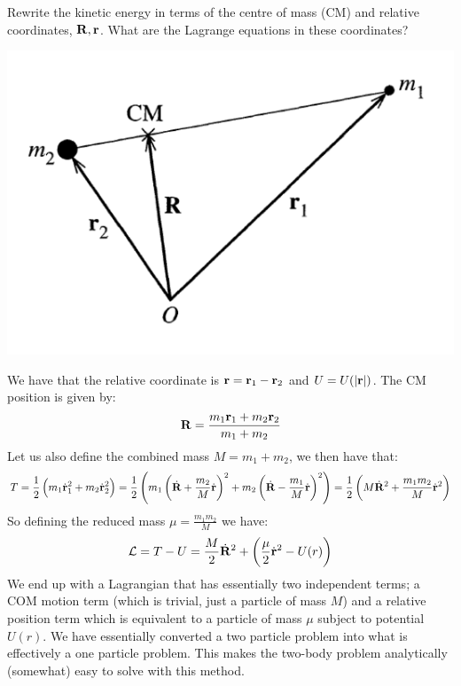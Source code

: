 \documentclass[../PHYS306Notes.tex]{subfiles}
\begin{document}
\begin{p}
Rewrite the kinetic energy in terms of the centre of mass (CM) and relative coordinates, $\mathbf{R}, \mathbf{r}$. What are the Lagrange equations in these coordinates?
\begin{center}
    \includegraphics[scale=0.6]{Lecture-3/W3-img1.png}
\end{center}
\end{p}
\begin{s}
We have that the relative coordinate is $\mathbf{r} = \mathbf{r}_1 - \mathbf{r}_2$ and $U = U(\abs{\mathbf{r}})$. The CM position is given by:
\[\mathbf{R} = \frac{m_1\mathbf{r}_1 + m_2\mathbf{r}_2}{m_1 + m_2}\]
Let us also define the combined mass $M = m_1 + m_2$, we then have that:
\[T = \frac{1}{2}\left(m_1\dot{\mathbf{r}}_1^2 + m_2\dot{\mathbf{r}}_2^2\right) = \frac{1}{2}\left(m_1\left(\dot{\mathbf{R}} + \frac{m_2}{M}\dot{\mathbf{r}}\right)^2 + m_2\left(\dot{\mathbf{R}} - \frac{m_1}{M}\dot{\mathbf{r}}\right)^2\right) = \frac{1}{2}\left(M\dot{\mathbf{R}}^2 + \frac{m_1m_2}{M}\dot{\mathbf{r}}^2\right)\]
So defining the reduced mass $\mu = \frac{m_1m_2}{M}$ we have:
\[\mathcal{L} = T - U = \frac{M}{2}\dot{\mathbf{R}}^2 + \left(\frac{\mu}{2}\dot{\mathbf{r}}^2 - U(r)\right)\]
We end up with a Lagrangian that has essentially two independent terms; a COM motion term (which is trivial, just a particle of mass $M$) and a relative position term which is equivalent to a particle of mass $\mu$ subject to potential $U(r)$. We have essentially converted a two particle problem into what is effectively a one particle problem. This makes the two-body problem analytically (somewhat) easy to solve with this method.
\end{s}
\end{document}
